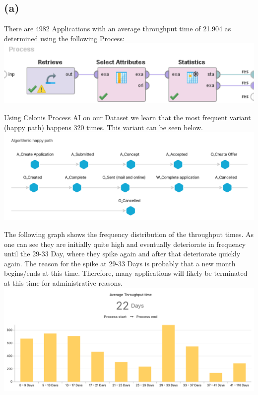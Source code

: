 \documentclass[../../main.tex]{subfiles}
\begin{document}
\subsection*{(a)}
There are 4982 Applications with an average throughput time of 21.904 as determined using the following Process:\\
\includegraphics[width=\textwidth]{img/QUESTION_5a_PROCESS_average_throughput_time.png}

Using Celonis Process AI on our Dataset we learn that the most frequent variant (happy path) happens 320 times. This variant can be seen below.\\
\includegraphics[width=\textwidth]{img/QUESTION_5a_happy_path.png}

The following graph shows the frequency distribution of the throughput times. As one can see they are initially quite high and eventually deteriorate in frequency until the 29-33 Day, where they spike again and after that deteriorate quickly again. The reason for the spike at 29-33 Days is probably that a new month begins/ends at this time. Therefore, many applications will likely be terminated at this time for administrative reasons.\\
\includegraphics[width=\textwidth]{img/QUESTION_5a_throughput_time_distribution.png}
\end{document}
